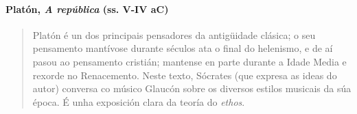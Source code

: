 

\paragraph{\texorpdfstring{Platón, \emph{A república} (ss. V-IV
aC)}{Platón, A república (ss. V-IV aC)}}\label{platuxf3n--a-repuxfablica--ss.-v-iv-ac}

\begin{quote}
Platón é un dos principais pensadores da antigüidade clásica; o seu pensamento mantívose durante séculos ata o final do helenismo, e de aí pasou ao pensamento cristián; mantense en parte durante a Idade Media e rexorde no Renacemento. Neste texto, Sócrates (que expresa as ideas do autor) conversa co músico Glaucón sobre os diversos estilos musicais da súa época. É unha exposición clara da teoría do \emph{ethos}.
\end{quote}


